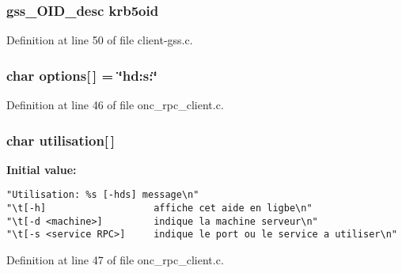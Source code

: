 \subsubsection{\setlength{\rightskip}{0pt plus 5cm}gss\_\-OID\_\-desc {\bf krb5oid}}\label{onc__rpc__client_8c_a8}




Definition at line 50 of file client-gss.c.
\subsubsection{\setlength{\rightskip}{0pt plus 5cm}char {\bf options}[$\,$] = \char`\"{}hd:s:\char`\"{}}\label{onc__rpc__client_8c_a9}




Definition at line 46 of file onc\_\-rpc\_\-client.c.
\subsubsection{\setlength{\rightskip}{0pt plus 5cm}char {\bf utilisation}[$\,$]}\label{onc__rpc__client_8c_a10}


{\bf Initial value:}

\footnotesize\begin{verbatim}
"Utilisation: %s [-hds] message\n"
"\t[-h]                   affiche cet aide en ligbe\n"
"\t[-d <machine>]         indique la machine serveur\n"
"\t[-s <service RPC>]     indique le port ou le service a utiliser\n"
\end{verbatim}\normalsize 


Definition at line 47 of file onc\_\-rpc\_\-client.c.